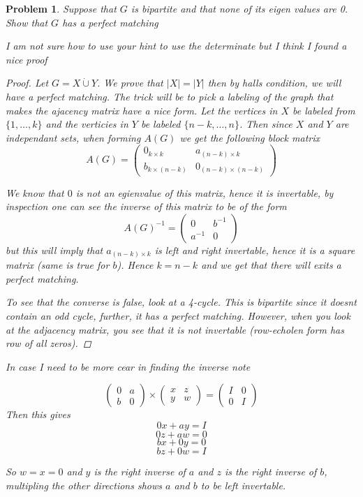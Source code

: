 \documentclass{article} \usepackage{amsmath, amsthm, hyperref}
\newtheorem{prb}{Problem}
\begin{document}
\begin{prb} 
Suppose that $G$ is bipartite and that none of its eigen values are 0. Show that $G$ has a perfect matching 



	I am not sure how to use your hint to use the determinate but I think I found a nice proof
\begin{proof} 
	Let $G = X \dot{\cup} Y$. We prove that $|X| = |Y|$ then by halls condition, we will have a perfect matching. 
The trick will be to pick a labeling of the graph that makes the ajacency matrix have a nice form. 
Let the vertices in $X$ be labeled from $\{1, \dots, k\}$ and the verticies in $Y$ be labeled $\{n-k, \dots, n \}$. 
Then since $X$ and $Y$ are independant sets, when forming $A(G)$ we get the following block matrix 
\[A(G) = \begin{pmatrix} 
	0_{k \times k} & a_{(n-k) \times k} \\ 
	b_{k \times (n-k) } & 0_{(n -k) \times (n-k) }
\end{pmatrix}
\]

We know that $0$ is not an egienvalue of this matrix, hence it is invertable, by inspection one can see the inverse of this matrix to be of the form 
\[A(G)^{-1} = \begin{pmatrix} 0 & b^{-1} \\ a^{-1} & 0 \end{pmatrix}\] 
but this will imply that $a_{(n - k) \times k}$ is left and right invertable, hence it is a square matrix (same is true for $b$). 
Hence $k = n-k$ and we get that there will exits a perfect matching. 


To see that the converse is false, look at a 4-cycle. This is bipartite since it doesnt contain an odd cycle, further, it has a perfect matching. 
However, when you look at the adjacency matrix, you see that it is not invertable (row-echolen form has row of all zeros). 
\end{proof}

In case I need to be more cear in finding the inverse note 

\[\begin{pmatrix} 0 & a \\ b & 0 \end{pmatrix} \times \begin{pmatrix} x & z \\ y &  w \end{pmatrix} = \begin{pmatrix} I & 0 \\ 0 & I\end{pmatrix} \] 
Then this gives 
\[ 0x + ay = I \] 
\[ 0 z + aw = 0 \] 
\[ bx + 0y = 0 \] 
\[ bz + 0w = I \] 

So $w = x = 0$ and $y$ is the right inverse of $a$ and $z$ is the right inverse of $b$, multipling the other directions shows $a$ and $b$ to be left invertable. 











\end{prb}
\end{document}
